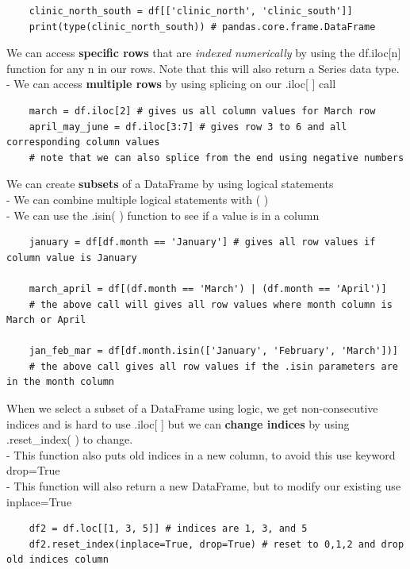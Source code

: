 \documentclass[11pt, a4paper]{article}
\begin{document}
\begin{spacing}{1.1}
\begin{lstlisting}
	clinic_north_south = df[['clinic_north', 'clinic_south']]
	print(type(clinic_north_south)) # pandas.core.frame.DataFrame \end{lstlisting}\vspace*{1mm}
	We can access \textbf{specific rows} that are \textit{indexed numerically} by using the df.iloc[n] function for any n in our rows. Note that this will also return a Series data type. \\
	\hspace*{4mm} - We can access \textbf{multiple rows} by using splicing on our .iloc[ ] call 
	\begin{lstlisting}
	march = df.iloc[2] # gives us all column values for March row
	april_may_june = df.iloc[3:7] # gives row 3 to 6 and all corresponding column values
	# note that we can also splice from the end using negative numbers \end{lstlisting} \newpage
	\noindent We can create \textbf{subsets} of a DataFrame by using logical statements \\
	\hspace*{4mm} - We can combine multiple logical statements with ( )  \\
	\hspace*{4mm} - We can use the .isin( ) function to see if a value is in a column
	\begin{lstlisting}
	january = df[df.month == 'January'] # gives all row values if column value is January
	
	march_april = df[(df.month == 'March') | (df.month == 'April')]
	# the above call will gives all row values where month column is March or April
	
	jan_feb_mar = df[df.month.isin(['January', 'February', 'March'])]
	# the above call gives all row values if the .isin parameters are in the month column\end{lstlisting}\vspace*{1mm}
	When we select a subset of a DataFrame using logic, we get non-consecutive indices and is hard to use .iloc[ ] but we can \textbf{change indices} by using .reset\_index( ) to change. \\ 
	\hspace*{4mm} - This function also puts old indices in a new column, to avoid this use keyword drop=True \\
	\hspace*{4mm} - This function will also return a new DataFrame, but to modify our existing use inplace=True
	\begin{lstlisting}
	df2 = df.loc[[1, 3, 5]] # indices are 1, 3, and 5
	df2.reset_index(inplace=True, drop=True) # reset to 0,1,2 and drop old indices column\end{lstlisting}\vspace*{4mm}
	

\end{spacing}
\end{document}
